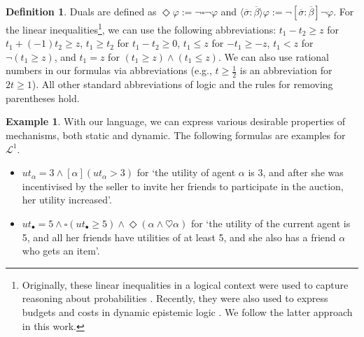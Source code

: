 \documentclass[letterpaper]{article} %
\theoremstyle{definition}
\newtheorem{definition}{Definition}
\newtheorem{example}{Example}
\begin{document}
\begin{definition}
Duals are defined as $\Diamond \varphi := \lnot \square \lnot \varphi$ and $\langle \overline{\sigma}:\overline{\beta} \rangle \varphi := \lnot [ \overline{\sigma}:\overline{\beta} ] \lnot \varphi$. For the linear inequalities\footnote{Originally, these linear inequalities in a logical context were used to capture reasoning about probabilities \cite{fagin90}. Recently, they were also used to express budgets and costs in dynamic epistemic logic \cite{DolgorukovGG24}. We follow the latter approach in this work. }, we can use the following abbreviations: $t_1 - t_2 \geqslant z$ for $t_1 + (-1)t_2 \geqslant z$,
$t_1 \geqslant t_2$ for $t_1 - t_2 \geqslant 0$,
$t_1\leqslant z$ for $-t_1\geqslant -z$, $t_1<z$ for $\neg (t_1 \geqslant z)$,
and $t_1 = z$ for $(t_1\geqslant z)\land (t_1\leqslant z)$. %
We can also use rational numbers in our formulas via abbreviations (e.g., $t\geqslant \frac{1}{2}$ is an
abbreviation for $2t\geqslant 1$).  
All other standard abbreviations of logic %
and the rules for removing parentheses hold.
\end{definition}

\begin{example}
With our language, we can express various desirable properties of mechanisms, both static and dynamic. The following formulas are examples for $\mathcal{L}^1$.
\begin{itemize}
    \item $ut_\alpha = 3 \land [\alpha ] (ut_\alpha > 3)$ for `the utility of agent $\alpha$ is 3, and after she was incentivised by the seller to invite her friends to participate in the auction, her utility increased'.
    \item $ut_\bullet = 5 \land \square (ut_\bullet \geqslant 5) \land \Diamond(\alpha \land \heartsuit \alpha)$ for `the utility of the current agent is 5, and all her friends have utilities of at least 5, and she also has a friend %
    $\alpha$ who gets an item'. %
\end{itemize}
\end{example}
\end{document}
